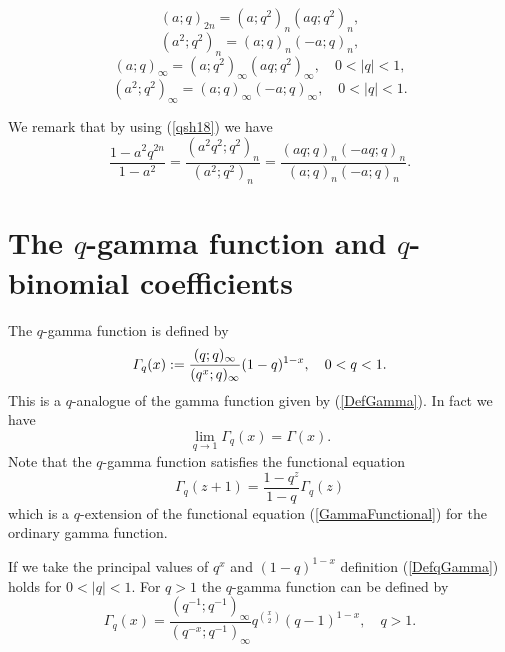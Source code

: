 \documentclass[envcountchap,graybox]{svmono}
\renewcommand{\Gamma}{\varGamma}
\begin{document}
\begin{equation}
\label{qsh17}
(a;q)_{2n}=(a;q^2)_n(aq;q^2)_n,
\end{equation}
\begin{equation}
\label{qsh18}
(a^2;q^2)_n=(a;q)_n(-a;q)_n,
\end{equation}
\begin{equation}
\label{qsh19}
(a;q)_{\infty}=(a;q^2)_{\infty}(aq;q^2)_{\infty},\quad 0<|q|<1,
\end{equation}
\begin{equation}
\label{qsh20}
(a^2;q^2)_{\infty}=(a;q)_{\infty}(-a;q)_{\infty},\quad 0<|q|<1.
\end{equation}

We remark that by using (\ref{qsh18}) we have
\begin{equation}
\label{qsh21}
\frac{1-a^2q^{2n}}{1-a^2}=\frac{(a^2q^2;q^2)_n}{(a^2;q^2)_n}
=\frac{(aq;q)_n(-aq;q)_n}{(a;q)_n(-a;q)_n}.
\end{equation}

\section{The $q$-gamma function and $q$-binomial coefficients}
\par\setcounter{equation}{0}
\label{qgamma function}

The $q$-gamma function is defined by
\begin{equation}
\label{DefqGamma}\index{q-Gamma function@$q$-Gamma function}
\Gamma_q(x):=\frac{(q;q)_{\infty}}{(q^x;q)_{\infty}}(1-q)^{1-x},\quad 0<q<1.
\end{equation}
This is a $q$-analogue of the gamma function given by (\ref{DefGamma}). In fact we have
$$\lim\limits_{q\rightarrow 1}\Gamma_q(x)=\Gamma(x).$$
Note that the $q$-gamma function satisfies the functional equation
\begin{equation}
\label{qGammaFunctional}
\Gamma_q(z+1)=\frac{1-q^z}{1-q}\Gamma_q(z)
\end{equation}
which is a $q$-extension of the functional equation (\ref{GammaFunctional}) for
the ordinary gamma function.

If we take the principal values of $q^x$ and $(1-q)^{1-x}$ definition (\ref{DefqGamma})
holds for $0<|q|<1$. For $q>1$ the $q$-gamma function can be defined by
\begin{equation}
\label{DefqGamma2}
\Gamma_q(x)=\frac{(q^{-1};q^{-1})_{\infty}}{(q^{-x};q^{-1})_{\infty}}
q^{\binom{x}{2}}(q-1)^{1-x},\quad q>1.
\end{equation}
\end{document}

